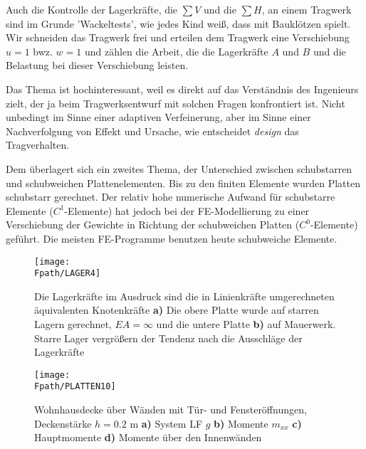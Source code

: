 {\begin{remark}
Auch die Kontrolle der Lagerkr\"{a}fte, die $\sum V$ und die $\sum H$, an einem Tragwerk sind im Grunde 'Wackeltests', wie jedes Kind wei{\ss}, dass mit Baukl\"{o}tzen spielt. Wir schneiden das Tragwerk frei und erteilen dem Tragwerk eine Verschiebung $u = 1$ bwz. $w = 1$ und z\"{a}hlen die Arbeit, die die Lagerkr\"{a}fte $A$ und $B$ und die Belastung bei dieser Verschiebung leisten.

\end{remark}

Das Thema ist hochinteressant, weil es direkt auf das Verst\"{a}ndnis des Ingenieurs zielt, der ja beim Tragwerksentwurf mit solchen Fragen konfrontiert ist. Nicht unbedingt im Sinne einer adaptiven Verfeinerung, aber im Sinne einer Nachverfolgung von Effekt und Ursache, wie entscheidet {\em design\/} das Tragverhalten.




Dem \"{u}berlagert sich ein zweites Thema, der Unterschied zwischen schubstarren und schubweichen Plattenelementen. Bis zu den finiten Elemente wurden Platten schubstarr gerechnet. Der relativ hohe numerische Aufwand f\"{u}r schubstarre Elemente ($C^1$-Elemente) hat jedoch bei der FE-Modellierung zu einer Verschiebung der Gewichte in Richtung der schubweichen Platten ($C^0$-Elemente) gef\"{u}hrt. Die meisten FE-Programme benutzen heute schubweiche Elemente.

\begin{figure}[tbp]
\if {} \sidecaption \fi
\texttt{[image: \\Fpath/LAGER4]}
\caption{Die Lagerkr\"{a}fte im Ausdruck sind die in Linienkr\"{a}fte umgerechneten \"{a}quivalenten
Knotenkr\"{a}fte {\bf a)} Die obere Platte wurde auf starren Lagern gerechnet, $EA = \infty$
und die untere Platte {\bf b)} auf Mauerwerk. Starre Lager vergr\"{o}{\ss}ern der Tendenz nach
die Ausschl\"{a}ge der Lagerkr\"{a}fte} \label{Lager4}
\end{figure}%

\begin{figure}[tbp]
\if {} \sidecaption \fi
\texttt{[image: \\Fpath/PLATTEN10]}
\caption{Wohnhausdecke \"{u}ber W\"{a}nden mit T\"{u}r- und Fenster\"{o}ffnungen, Deckenst\"{a}rke $h = 0.2$
m {\bf a)} System LF $g$ {\bf b)} Momente $m_{xx}$ {\bf c)} Hauptmomente {\bf d)}
Momente \"{u}ber den Innenw\"{a}nden} \label{Platten10}
\end{figure}%


}
